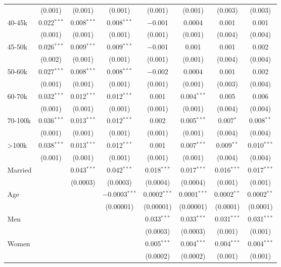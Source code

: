 \begin{table}[!htbp]
\begin{tabular}{@{\extracolsep{5pt}}lccccccc}
  & (0.001) & (0.001) & (0.001) & (0.001) & (0.001) & (0.003) & (0.003) \\ 
  40-45k & 0.022$^{***}$ & 0.008$^{***}$ & 0.008$^{***}$ & $-$0.001 & 0.0004 & 0.001 & 0.001 \\ 
  & (0.001) & (0.001) & (0.001) & (0.001) & (0.001) & (0.004) & (0.004) \\ 
  45-50k & 0.026$^{***}$ & 0.009$^{***}$ & 0.009$^{***}$ & $-$0.001 & 0.001 & 0.001 & 0.002 \\ 
  & (0.002) & (0.001) & (0.001) & (0.001) & (0.001) & (0.004) & (0.004) \\ 
  50-60k & 0.027$^{***}$ & 0.008$^{***}$ & 0.008$^{***}$ & $-$0.002 & 0.0004 & 0.001 & 0.002 \\ 
  & (0.001) & (0.001) & (0.001) & (0.001) & (0.001) & (0.003) & (0.004) \\ 
  60-70k & 0.032$^{***}$ & 0.012$^{***}$ & 0.012$^{***}$ & 0.001 & 0.004$^{***}$ & 0.005 & 0.006 \\ 
  & (0.001) & (0.001) & (0.001) & (0.001) & (0.001) & (0.004) & (0.004) \\ 
  70-100k & 0.036$^{***}$ & 0.013$^{***}$ & 0.012$^{***}$ & 0.002 & 0.005$^{***}$ & 0.007$^{*}$ & 0.008$^{**}$ \\ 
  & (0.001) & (0.001) & (0.001) & (0.001) & (0.001) & (0.004) & (0.004) \\ 
  >100k & 0.038$^{***}$ & 0.013$^{***}$ & 0.012$^{***}$ & 0.001 & 0.007$^{***}$ & 0.009$^{**}$ & 0.010$^{***}$ \\ 
  & (0.001) & (0.001) & (0.001) & (0.001) & (0.001) & (0.004) & (0.004) \\ 
  Married &  & 0.043$^{***}$ & 0.042$^{***}$ & 0.018$^{***}$ & 0.017$^{***}$ & 0.016$^{***}$ & 0.017$^{***}$ \\ 
  &  & (0.0003) & (0.0003) & (0.0004) & (0.0004) & (0.001) & (0.001) \\ 
  Age &  &  & $-$0.0003$^{***}$ & 0.0002$^{***}$ & 0.0001$^{***}$ & 0.0002$^{**}$ & 0.0002$^{**}$ \\ 
  &  &  & (0.00001) & (0.00001) & (0.00001) & (0.0001) & (0.0001) \\ 
  Men &  &  &  & 0.033$^{***}$ & 0.033$^{***}$ & 0.031$^{***}$ & 0.031$^{***}$ \\ 
  &  &  &  & (0.0003) & (0.0003) & (0.001) & (0.001) \\ 
  Women &  &  &  & 0.005$^{***}$ & 0.004$^{***}$ & 0.004$^{***}$ & 0.004$^{***}$ \\ 
  &  &  &  & (0.0002) & (0.0002) & (0.001) & (0.001) \\ 

\end{tabular}
\end{table}
